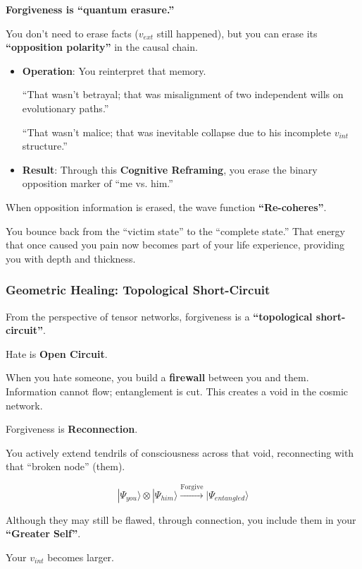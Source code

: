 \textbf{Forgiveness is ``quantum erasure.''}

You don't need to erase facts ($v_{ext}$ still happened), but you can erase its \textbf{``opposition polarity''} in the causal chain.

\begin{itemize}
\item \textbf{Operation}: You reinterpret that memory.

``That wasn't betrayal; that was misalignment of two independent wills on evolutionary paths.''

``That wasn't malice; that was inevitable collapse due to his incomplete $v_{int}$ structure.''

\item \textbf{Result}: Through this \textbf{Cognitive Reframing}, you erase the binary opposition marker of ``me vs. him.''
\end{itemize}

When opposition information is erased, the wave function \textbf{``Re-coheres''}.

You bounce back from the ``victim state'' to the ``complete state.'' That energy that once caused you pain now becomes part of your life experience, providing you with depth and thickness.

\subsubsection{Geometric Healing: Topological Short-Circuit}

From the perspective of tensor networks, forgiveness is a \textbf{``topological short-circuit''}.

Hate is \textbf{Open Circuit}.

When you hate someone, you build a \textbf{firewall} between you and them. Information cannot flow; entanglement is cut. This creates a void in the cosmic network.

Forgiveness is \textbf{Reconnection}.

You actively extend tendrils of consciousness across that void, reconnecting with that ``broken node'' (them).

\[|\Psi_{you}\rangle \otimes |\Psi_{him}\rangle \xrightarrow{\text{Forgive}} |\Psi_{entangled}\rangle\]

Although they may still be flawed, through connection, you include them in your \textbf{``Greater Self''}.

Your $v_{int}$ becomes larger.

